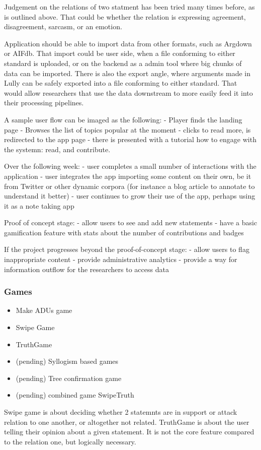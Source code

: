 \documentclass{article}
\begin{document}
Judgement on the relations of two statment has been tried many times before, as is outlined above. That could be whether the relation is expressing agreement, disagreement, sarcasm, or an emotion.

Application should be able to import data from other formats, such as Argdown or AIFdb. That import could be user side, when a file conforming to either standard is uploaded, or on the backend as a admin tool where big chunks of data can be imported.
There is also the export angle, where arguments made in Lully can be safely exported into a file conforming to either standard. That would allow researchers that use the data downstream to more easily feed it into their processing pipelines.

A sample user flow can be imaged as the following:
- Player finds the landing page
- Browses the list of topics popular at the moment
- clicks to read more, is redirected to the app page
- there is presented with a tutorial how to engage with the systemn: read, and contribute.

Over the following week:
- user completes a small number of interactions with the application
- user integrates the app importing some content on their own, be it from Twitter or other dynamic corpora (for instance a blog article to annotate to understand it better)
- user continues to grow their use of the app, perhaps using it as a note taking app

Proof of concept stage:
- allow users to see and add new statements
- have a basic gamification feature with stats about the number of contributions and badges

If the project progresses beyond the proof-of-concept stage:
- allow users to flag inappropriate content
- provide administrative analytics 
- provide a way for information outflow for the researchers to access data

\subsubsection{Games}
\begin{itemize}
  \item Make ADUs game
  \item Swipe Game
  \item TruthGame 
  \item (pending) Syllogism based games
  \item (pending) Tree confirmation game
  \item (pending) combined game SwipeTruth
\end{itemize}
Swipe game is about deciding whether 2 statemnts are in support or attack relation to one another, or altogether not related.
TruthGame is about the user telling their opinion about a given statement. It is not the core feature compared to the relation one, but logically necessary.
\end{document}
